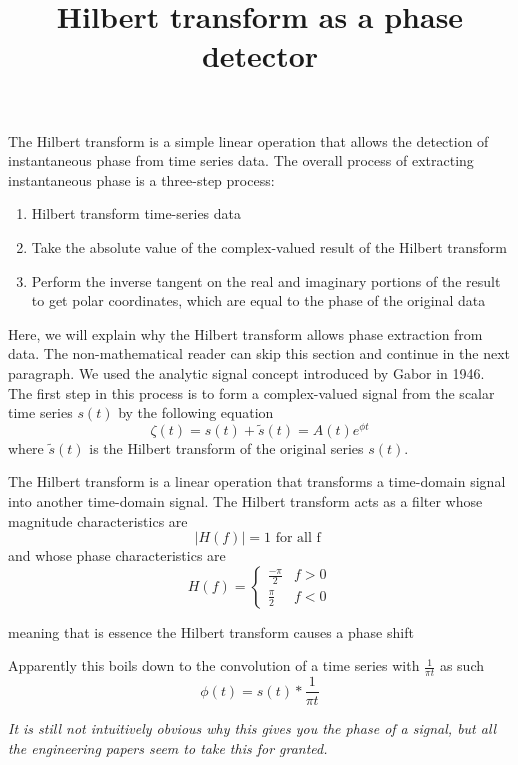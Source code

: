 \documentclass{article}
\begin{document}
\title{Hilbert transform as a phase detector}
\author{}
\date{}
\maketitle
The Hilbert transform is a simple linear operation that allows the detection of instantaneous phase from time series data. The overall process of extracting instantaneous phase is a three-step process: \begin{enumerate}
	\item Hilbert transform time-series data 
	\item Take the absolute value of the complex-valued result of the Hilbert transform
	\item Perform the inverse tangent on the real and imaginary portions of the result to get polar coordinates, which are equal to the phase of the original data
\end{enumerate}	
Here, we will explain why the Hilbert transform allows phase extraction from data. The non-mathematical reader can skip this section and continue in the next paragraph. We used the analytic signal concept introduced by Gabor in 1946. The first step in this process is to form a complex-valued signal from the scalar time series $s\left(t\right)$ by the following equation $$ \zeta\left(t\right)=s\left(t\right)+\tilde{s}\left(t\right)=A\left(t\right)e^{\phi t}$$ where $\tilde{s}\left(t\right)$ is the Hilbert transform of the original series $s\left(t\right)$.

The Hilbert transform is a linear operation that transforms a time-domain signal into another time-domain signal. The Hilbert transform acts as a filter whose magnitude characteristics are
$$ |H(f)| = 1 \mbox{ for all f }$$
and whose phase characteristics are
\[ H(f)=
	\begin{cases}
		\frac{-\pi}{2} & f > 0\\
		\frac{\pi}{2} & f < 0
	\end{cases}
\]

meaning that is essence the Hilbert transform causes a phase shift 

Apparently this boils down to the convolution of a time series with $\frac{1}{\pi t}$ as such
$$\phi (t) = s(t) \ast \frac{1}{\pi t}$$

\textit{It is still not intuitively obvious why this gives you the phase of a signal, but all the engineering papers seem to take this for granted.}
\end{document}
